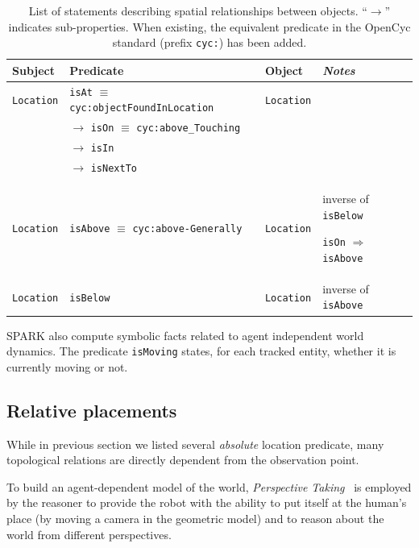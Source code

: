 \documentclass{svmult}
\newcommand{\concept}[1]{{\footnotesize \texttt{#1}}}
\begin{document}
\begin{table}[h]
    \centering
    \begin{tabular}{p{1.5cm}p{5cm}p{2cm}p{4cm}}
	\rowcolor{white}
    \textbf{Subject} & \textbf{Predicate} & \textbf{Object} & \emph{Notes} \\ 
    \hline
	 \concept{Location} & \concept{isAt} $\equiv$ \concept{cyc:objectFoundInLocation}  &  \concept{Location} & \\ 
	 &  $\rightarrow$ \concept{isOn} $\equiv$ \concept{cyc:above\_Touching}  &  & \\ 
	 &  $\rightarrow$ \concept{isIn}  &  & \\ 
	 &  $\rightarrow$ \concept{isNextTo}  & &  \\ 
	 \concept{Location}  & \concept{isAbove} $\equiv$ \concept{cyc:above-Generally}  &  \concept{Location}  &  inverse of \concept{isBelow} \par \concept{isOn} $\Rightarrow$ \concept{isAbove}\\ 
	 \concept{Location}  & \concept{isBelow}  & \concept{Location}  &  inverse of \concept{isAbove}
	\end{tabular}

	\caption{List of statements describing spatial relationships between
	objects. ``$\rightarrow$'' indicates sub-properties. When existing, the
	equivalent predicate in the {\sc OpenCyc} standard (prefix \concept{cyc:})
	has been added.}

\label{facts|sprelations}
\end{table}

SPARK also compute symbolic facts related to agent independent world dynamics.
The predicate \concept{isMoving} states, for each tracked entity, whether it is
currently moving or not.


\subsection{Relative placements}

While in previous section we listed several \emph{absolute} location predicate,
many topological relations are directly dependent from the observation point.

To build an agent-dependent model of the world, \emph{Perspective
Taking}~\cite{Flavell1992,Tversky1999} is employed by the reasoner to provide
the robot with the ability to put itself at the human's place (by moving a
camera in the geometric model) and to reason about the world from different
perspectives.
\end{document}

